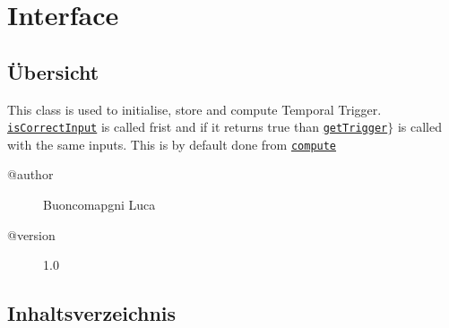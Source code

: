 
\section[OFTimeTriggerInterface]{Interface }\label{ontologyFramework.OFEventManagement.OFTimeTriggerManagement.OFTimeTriggerInterface-class}
\subsection{Übersicht}
This class is used to initialise, store and compute Temporal Trigger.
 \texttt{\hyperlink{ontologyFramework.OFEventManagement.OFTimeTriggerManagement.OFTimeTriggerInterface.isCorrectInput(java.util.List<ontologyFramework.OFEventManagement.EventComputedData>)}{isCorrectInput}} is called frist and if it returns true
 than \texttt{\hyperlink{ontologyFramework.OFEventManagement.OFTimeTriggerManagement.OFTimeTriggerInterface.getTrigger(java.util.List<ontologyFramework.OFEventManagement.EventComputedData>,ontologyFramework.OFRunning.OFInvokingManager.OFBuildedListInvoker)}{getTrigger}}$\}$ is called with the
 same inputs. This is by default done from \texttt{\hyperlink{ontologyFramework.OFEventManagement.OFTimeTriggerManagement.OFTimeTriggerDefinition.compute(ontologyFramework.OFRunning.OFInvokingManager.OFBuildedListInvoker)}{compute}}
\begin{description}
\item[@author] 
Buoncomapgni Luca
\item[@version] 
1.0
\end{description}
\subsection{Inhaltsverzeichnis}
